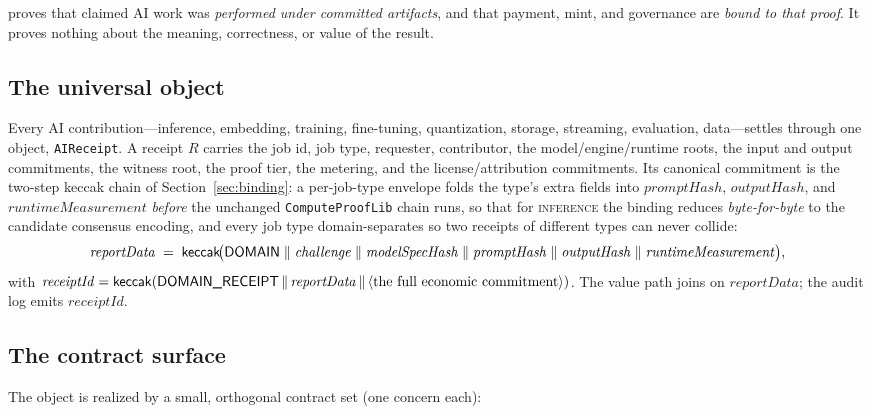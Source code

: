 \begin{principle}
\PoAI{} proves that claimed AI work was \emph{performed under committed artifacts},
and that payment, mint, and governance are \emph{bound to that proof}. It proves
nothing about the meaning, correctness, or value of the result.
\end{principle}

\subsection{The universal object}
\label{sec:rs-receipt}

Every AI contribution---inference, embedding, training, fine-tuning, quantization,
storage, streaming, evaluation, data---settles through one object,
\texttt{AIReceipt}. A receipt $R$ carries the job id, job type, requester,
contributor, the model/engine/runtime roots, the input and output commitments, the
witness root, the proof tier, the metering, and the license/attribution commitments.
Its canonical commitment is the two-step keccak chain of
Section~\ref{sec:binding}: a per-job-type envelope folds the type's extra
fields into $\mathit{promptHash}$, $\mathit{outputHash}$, and
$\mathit{runtimeMeasurement}$ \emph{before} the unchanged \texttt{ComputeProofLib}
chain runs, so that for \textsc{inference} the binding reduces \emph{byte-for-byte}
to the candidate consensus encoding, and every job type domain-separates so
two receipts of different types can never collide:
\[
\mathit{reportData} \;=\; \mathsf{keccak}\!\big(\textsf{DOMAIN}\;\|\;\mathit{challenge}\;\|\;
  \mathit{modelSpecHash}\;\|\;\mathit{promptHash}\;\|\;\mathit{outputHash}\;\|\;
  \mathit{runtimeMeasurement}\big),
\]
with $\mathit{receiptId} = \mathsf{keccak}(\textsf{DOMAIN\_RECEIPT}\,\|\,\mathit{reportData}\,\|\,
\langle\text{the full economic commitment}\rangle)$. The value path joins on
$\mathit{reportData}$; the audit log emits $\mathit{receiptId}$.

\subsection{The contract surface}
\label{sec:rs-contracts}

The object is realized by a small, orthogonal contract set (one concern each):

